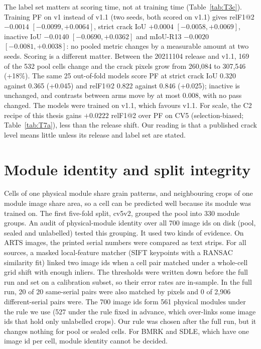 The label set matters at scoring time, not at training time (Table~\ref{tab:T3c}). Training PF on v1 instead of v1.1 (two seeds,
both scored on v1.1) gives relF1@2 $-0.0014$ $[-0.0099, +0.0064]$, strict crack IoU $+0.0004$ $[-0.0058, +0.0069]$, inactive IoU
$-0.0140$ $[-0.0690, +0.0362]$ and mIoU-R13 $-0.0020$ $[-0.0081, +0.0038]$: no pooled metric changes by a measurable amount at two
seeds. Scoring is a different matter. Between the 20211104 release and v1.1, 169 of the 532 pool cells change and the crack pixels
grow from 260,084 to 307,546 (+18\%). The same 25 out-of-fold models score PF at strict crack IoU 0.320 against 0.365 (+0.045) and
relF1@2 0.822 against 0.846 (+0.025); inactive is unchanged, and contrasts between arms move by at most 0.008, with no pass changed.
The models were trained on v1.1, which favours v1.1. For scale, the C2 recipe of this thesis gains $+0.0222$ relF1@2 over PF on CV5
(selection-biased; Table~\ref{tab:T7a}), less than the release shift. Our reading is that a published crack level means little
unless its release and label set are stated.

\section{Module identity and split integrity}\label{sec:data-split}

Cells of one physical module share grain patterns, and neighbouring crops of one module image share area, so a cell can be
predicted well because its module was trained on. The first five-fold split, cv5v2, grouped the pool into 330 module groups. An audit of physical-module identity over all 700 image ids on disk (pool,
sealed and unlabelled) tested this grouping. It used two kinds of evidence. On ARTS images, the printed serial numbers were compared
as text strips. For all sources, a masked local-feature matcher (SIFT keypoints with a RANSAC similarity fit) linked two image ids when a cell pair
matched under a whole-cell grid shift with enough inliers. The thresholds were written down before the full run and set on a
calibration subset, so their error rates are in-sample. In the full run, 20 of 20 same-serial pairs were also matched by pixels
and 0 of 2,906 different-serial pairs were. The 700 image ids form 561 physical modules under the rule we use (527
under the rule fixed in advance, which over-links some image ids that hold only unlabelled crops). Our rule was chosen after the
full run, but it changes nothing for pool or sealed cells. For BMRK and SDLE, which have one image id per cell, module identity
cannot be decided.

